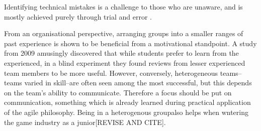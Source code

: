\documentclass{scrartcl}
\begin{document}
Identifying technical mistakes is a challenge to those who are unaware, and is mostly achieved purely through trial and error \cite{capstone}. 

From an organisational perspective, arranging groups into a smaller ranges of past experience is shown to be beneficial from a motivational standpoint. A study from 2009 \cite{peerreview} amusingly discovered that while students prefer to learn from the experienced, in a blind experiment they found reviews from lesser experienced team members to be more useful.\cite{peerreview} However, conversely, heterogeneous teams--teams varied in skill--are often seen among the most successful, but this depends on the team's ability to communicate. \cite{group2003} Therefore a focus should be put on communication, something which is already learned during practical application of the agile philosophy. Being in a heterogenous groupalso helps when wntering the game industry as a junior[REVISE AND CITE].

 

\end{document}
